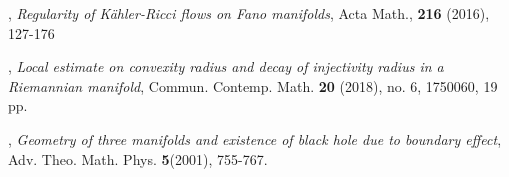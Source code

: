 \documentclass{amsart}
\numberwithin{equation}{section}
\theoremstyle{remark}
\renewcommand{\(}{\left(}
\renewcommand{\)}{\right)}
\renewcommand{\~}{\tilde}
\renewcommand{\-}{\overline}
\begin{document}
\begin{thebibliography}{10}
, {\em Regularity of K\"ahler-Ricci flows on Fano manifolds}, Acta Math., {\bf 216} (2016), 127-176

, {\em Local estimate on convexity radius and decay of injectivity radius in a Riemannian manifold}, Commun. Contemp. Math. {\bf 20} (2018), no. 6, 1750060, 19 pp.

, {\em Geometry of three manifolds and existence of black hole due to boundary effect}, Adv. Theo. Math. Phys. {\bf 5}(2001), 755-767.


	
\end{thebibliography}
\end{document}
